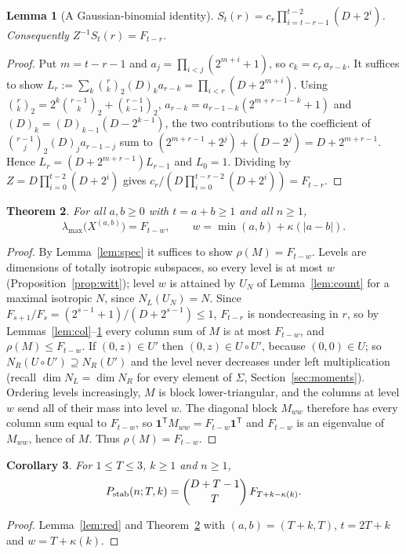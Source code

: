 \documentclass[11pt]{article}
\newcommand{\one}{\mathbf 1}
\newtheorem{theorem}{Theorem}
\newtheorem{lemma}[theorem]{Lemma}
\newtheorem{corollary}[theorem]{Corollary}
\theoremstyle{definition}
\theoremstyle{remark}
\begin{document}
\begin{lemma}[A Gaussian-binomial identity]\label{lem:q}
$S_t(r)=c_r\prod_{i=t-r-1}^{t-2}(D+2^i)$. Consequently $Z^{-1}S_t(r)=F_{t-r}$.
\end{lemma}
\begin{proof}
Put $m=t-r-1$ and $a_j=\prod_{i<j}(2^{m+i}+1)$, so $c_k=c_r\,a_{r-k}$. It suffices to show
$L_r:=\sum_k\binom rk_2(D)_ka_{r-k}=\prod_{i<r}(D+2^{m+i})$. Using $\binom rk_2=2^k\binom{r-1}k_2+\binom{r-1}{k-1}_2$,
$a_{r-k}=a_{r-1-k}(2^{m+r-1-k}+1)$ and $(D)_k=(D)_{k-1}(D-2^{k-1})$, the two contributions to the coefficient of
$\binom{r-1}j_2(D)_ja_{r-1-j}$ sum to $(2^{m+r-1}+2^j)+(D-2^j)=D+2^{m+r-1}$. Hence $L_r=(D+2^{m+r-1})L_{r-1}$ and
$L_0=1$. Dividing by $Z=D\prod_{i=0}^{t-2}(D+2^i)$ gives $c_r/(D\prod_{i=0}^{t-r-2}(D+2^i))=F_{t-r}$.
\end{proof}

\begin{theorem}\label{thm:main}
For all $a,b\ge0$ with $t=a+b\ge1$ and all $n\ge1$,
\[
\lambda_{\max}\big(X^{(a,b)}\big)=F_{t-w},\qquad w=\min(a,b)+\kappa(|a-b|).
\]
\end{theorem}
\begin{proof}
By Lemma~\ref{lem:spec} it suffices to show $\rho(M)=F_{t-w}$. Levels are dimensions of totally isotropic
subspaces, so every level is at most $w$ (Proposition~\ref{prop:witt}); level $w$ is attained by $U_N$ of
Lemma~\ref{lem:count} for a maximal isotropic $N$, since $N_L(U_N)=N$. Since $F_{s+1}/F_s=(2^{s-1}+1)/(D+2^{s-1})\le1$,
$F_{t-r}$ is nondecreasing in $r$, so by Lemmas~\ref{lem:col}--\ref{lem:q} every column sum of $M$ is at most
$F_{t-w}$, and $\rho(M)\le F_{t-w}$. If $(0,z)\in U'$ then $(0,z)\in U\circ U'$, because $(0,0)\in U$; so
$N_R(U\circ U')\supseteq N_R(U')$ and the level never decreases under left multiplication (recall $\dim N_L=\dim N_R$ for every element of $\Sigma$,
Section~\ref{sec:moments}). Ordering levels
increasingly, $M$ is block lower-triangular, and the columns at level $w$ send all of their mass into level $w$.
The diagonal block $M_{ww}$ therefore has every column sum equal to $F_{t-w}$, so $\one^{\mathsf T}M_{ww}=F_{t-w}
\one^{\mathsf T}$ and $F_{t-w}$ is an eigenvalue of $M_{ww}$, hence of $M$. Thus $\rho(M)=F_{t-w}$.
\end{proof}

\begin{corollary}\label{cor:clone}
For $1\le T\le3$, $k\ge1$ and $n\ge1$,
\[
P_{\rm stab}(n;T,k)=\binom{D+T-1}{T}\,F_{T+k-\kappa(k)}.
\]
\end{corollary}
\begin{proof}
Lemma~\ref{lem:red} and Theorem~\ref{thm:main} with $(a,b)=(T+k,T)$, $t=2T+k$ and $w=T+\kappa(k)$.
\end{proof}
\end{document}
